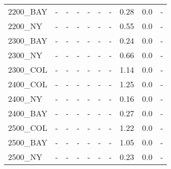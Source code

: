 \documentclass[main.tex]{subfiles}
\begin{document}
\begin{center}
\begin{tabular}{lccccccccc}
2200\_BAY & - & - 
 & - & - 
 & - & - 
 & 0.28 & 0.0 & - \\
2200\_NY & - & - 
 & - & - 
 & - & - 
 & 0.55 & 0.0 & - \\
2300\_BAY & - & - 
 & - & - 
 & - & - 
 & 0.24 & 0.0 & - \\
2300\_NY & - & - 
 & - & - 
 & - & - 
 & 0.66 & 0.0 & - \\
2300\_COL & - & - 
 & - & - 
 & - & - 
 & 1.14 & 0.0 & - \\
2400\_COL & - & - 
 & - & - 
 & - & - 
 & 1.25 & 0.0 & - \\
2400\_NY & - & - 
 & - & - 
 & - & - 
 & 0.16 & 0.0 & - \\
2400\_BAY & - & - 
 & - & - 
 & - & - 
 & 0.27 & 0.0 & - \\
2500\_COL & - & - 
 & - & - 
 & - & - 
 & 1.22 & 0.0 & - \\
2500\_BAY & - & - 
 & - & - 
 & - & - 
 & 1.05 & 0.0 & - \\
2500\_NY & - & - 
 & - & - 
 & - & - 
 & 0.23 & 0.0 & - \\
\hline\end{tabular}
\end{center}
\end{document}
